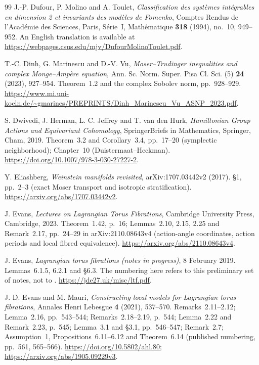 \begin{thebibliography}{99}
J.-P. Dufour, P. Molino and A. Toulet,
\emph{Classification des systèmes intégrables en dimension 2 et invariants des modèles de Fomenko},
Comptes Rendus de l'Académie des Sciences, Paris, Série~I, Mathématique
\textbf{318} (1994), no.~10, 949--952.
An English translation is available at
\url{https://webpages.csus.edu/mjv/DufourMolinoToulet.pdf}.

T.-C. Dinh, G. Marinescu and D.-V. Vu,
\emph{Moser--Trudinger inequalities and complex Monge--Amp\`ere equation},
Ann. Sc. Norm. Super. Pisa Cl. Sci. (5) \textbf{24} (2023), 927--954.
Theorem~1.2 and the complex Sobolev norm, pp.~928--929.
\url{https://www.mi.uni-koeln.de/~gmarines/PREPRINTS/Dinh_Marinescu_Vu_ASNP_2023.pdf}.

S. Dwivedi, J. Herman, L. C. Jeffrey and T. van den Hurk,
\emph{Hamiltonian Group Actions and Equivariant Cohomology},
SpringerBriefs in Mathematics, Springer, Cham, 2019.
Theorem~3.2 and Corollary~3.4, pp.~17--20 (symplectic neighborhood);
Chapter~10 (Duistermaat--Heckman).
\url{https://doi.org/10.1007/978-3-030-27227-2}.

Y. Eliashberg,
\emph{Weinstein manifolds revisited},
arXiv:1707.03442v2 (2017).
\S1, pp.~2--3 (exact Moser transport and isotropic stratification).
\url{https://arxiv.org/abs/1707.03442v2}.

J. Evans,
\emph{Lectures on Lagrangian Torus Fibrations},
Cambridge University Press, Cambridge, 2023.
Theorem~1.42, p.~16; Lemmas~2.10, 2.15, 2.25 and Remark~2.17,
pp.~24--29 in arXiv:2110.08643v4 (action-angle coordinates, action periods and local fibred equivalence).
\url{https://arxiv.org/abs/2110.08643v4}.

J. Evans,
\emph{Lagrangian torus fibrations (notes in progress)},
8 February 2019.
Lemmas~6.1.5, 6.2.1 and \S6.3.
The numbering here refers to this preliminary set of notes, not to \cite{Evans}.
\url{https://jde27.uk/misc/ltf.pdf}.

J. D. Evans and M. Mauri,
\emph{Constructing local models for Lagrangian torus fibrations},
Annales Henri Lebesgue \textbf{4} (2021), 537--570.
Remarks~2.11--2.12; Lemma~2.16, pp.~543--544; Remarks~2.18--2.19, p.~544;
Lemma~2.22 and Remark~2.23, p.~545;
Lemma~3.1 and \S3.1, pp.~546--547; Remark~2.7;
Assumption~1, Propositions~6.11--6.12 and Theorem~6.14
(published numbering, pp.~561, 565--566).
\url{https://doi.org/10.5802/ahl.80};
\url{https://arxiv.org/abs/1905.09229v3}.


\end{thebibliography}
